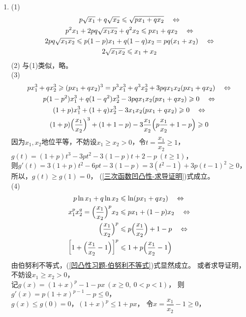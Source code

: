 \begin{enumerate}[label={\textbf{\arabic*.}},leftmargin=
    \inteval{\myenumleftmargin}pt]
\item  (1)
\begin{gather*}
    p\sqrt{x_1}+q\sqrt{x_2}\leqslant \sqrt{px_1+qx_2}\quad \Leftrightarrow \\
    p^2x_1+2pq\sqrt{x_1x_2}+q^2x_2\leqslant px_1+qx_2\quad \Leftrightarrow \\
    2pq\sqrt{x_1x_2}\leqslant p(1-p)x_1+q(1-q)x_2=pq(x_1+x_2)\quad \Leftrightarrow \\
    2\sqrt{x_1x_2}\leqslant x_1+x_2    
\end{gather*}
(2) 与(1)类似，略。\\
(3) 
\begin{gather}
    px_1^3+qx_2^3\geqslant (px_1+qx_2)^3=p^3x_1^3+q^3x_2^3+3pqx_1x_2(px_1+qx_2)
    \quad \Leftrightarrow \nonumber\\ 
    p(1-p^2)x_1^3+q(1-q^2)x_2^3-3pqx_1x_2(px_1+qx_2)\geqslant 0
    \quad \Leftrightarrow \nonumber \\
    (1+p)x_1^3+(1+q)x_2^3-3x_1x_2(px_1+qx_2)\geqslant 0
    \quad \Leftrightarrow \nonumber \\
    (1+p)\Big(\dfrac{x_1}{x_2}\Big)^3+(1+1-p)-3\dfrac{x_1}{x_2}
    \Big(p\dfrac{x_1}{x_2}+1-p\Big)\geqslant 0 \label{三次函数凹凸性-求导证明}
\end{gather}
因为$ x_1,x_2 $地位平等，不妨设$ x_1\geq x_2>0 $，令$ t=\dfrac{x_1}{x_2}\geq 1 $，\\
$ g(t)=(1+p)t^3-3pt^2-3(1-p)t+2-p\ (t\geq 1) $，\\ 则$ g'(t)=3(1+p)t^2-6pt-3(1-p)=
3(t^2-1)+3p(t-1)^2\geq 0 $，所以，$ g(t)\geq g(1)=0 $，
(\ref{三次函数凹凸性-求导证明})式成立。\\
(4) 
\begin{align}
    p\ln x_1+q\ln x_2 &\leqslant \ln(px_1+qx_2) \quad \Leftrightarrow \nonumber\\
    x_1^{p}x_2^q=\Big(\dfrac{x_1}{x_2}\Big)^p x_2 &\leqslant px_1+(1-p)x_2
    \quad \Leftrightarrow \nonumber\\
    \Big(\dfrac{x_1}{x_2}\Big)^p &\leqslant p\Big(\dfrac{x_1}{x_2}\Big)+1-p
    \quad \Leftrightarrow \nonumber\\
    \left[1+\Big(\dfrac{x_1}{x_2}-1\Big)\right]^p &\leqslant 
    1+p\Big(\dfrac{x_1}{x_2}-1\Big) \label{凹凸性习题-伯努利不等式}
\end{align}
由伯努利不等式，(\ref{凹凸性习题-伯努利不等式})式显然成立。
或者求导证明，不妨设$ x_1\geq x_2>0 $，\\
记$ g(x)=(1+x)^p-1-px\ (x\geq 0,\ 0<p<1) $，
则$ g'(x)=p(1+x)^{p-1}-p\leq 0 $，\\ 
$ g(x)\leq g(0)=0 $，$ (1+x)^p\leq 1+px $，
令$ x=\dfrac{x_1}{x_2}-1\geq 0 $，

\end{enumerate}
